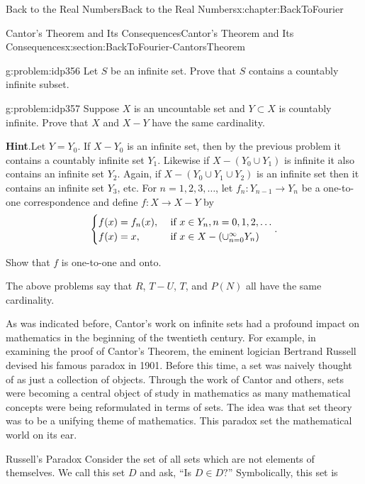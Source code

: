 \begin{chapterptx}{Back to the Real Numbers}{}{Back to the Real Numbers}{}{}{x:chapter:BackToFourier}
\begin{sectionptx}{Cantor's Theorem and Its Consequences}{}{Cantor's Theorem and Its Consequences}{}{}{x:section:BackToFourier-CantorsTheorem}
		\begin{problem}{}{g:problem:idp356}%
			 Let \(S\) be an infinite set. Prove that \(S\) contains a countably infinite subset.%
		\end{problem}
		\begin{problem}{}{g:problem:idp357}%
			Suppose \(X\) is an uncountable set and \(Y\subset X\) is countably infinite.  Prove that \(X\) and \(X-Y\) have the same cardinality.%
			\par\smallskip%
			\noindent\textbf{\blocktitlefont Hint}.\hypertarget{g:hint:idp358}{}\quad{}Let \(Y=Y_0\). If \(X-Y_0\) is an infinite set, then by the previous problem it contains a countably infinite set \(Y_1\). Likewise if \(X-(Y_0\cup Y_1)\) is infinite it also contains an infinite set \(Y_2\). Again, if \(X-(Y_0\cup Y_1\cup Y_2)\) is an infinite set then it contains an infinite set \(Y_3\), etc. For \(n=1, 2, 3,\ldots \), let \(f_n:Y_{n-1}\rightarrow Y_n\) be a one-to-one correspondence and define \(f:X\rightarrow X-Y\) by%
			\begin{equation*}
				\begin{cases}f(x)=f_n(x), & \text{ if }  x\in Y_n, n=0,1,2,\ldots\\ f(x)=x, & \text{ if }  x\in X-(\cup_{n=0}^\infty Y_n ) \end{cases} \text{.}
			\end{equation*}
			\par
			Show that \(f\) is one-to-one and onto.%
		\end{problem}
		The above problems say that \(R\), \(T-U\), \(T\), and \(P(N)\) all have the same cardinality.%
		\par
		As was indicated before, Cantor's  work on infinite sets had a profound impact on mathematics in the beginning of the twentieth century. For example, in examining the proof of Cantor's Theorem, the eminent logician Bertrand Russell devised his famous paradox in 1901. Before this time, a set was naively thought of as just a collection of objects. Through the work of Cantor and others, sets were becoming a central object of study in mathematics as many mathematical concepts were being reformulated in terms of sets. The idea was that set theory was to be a unifying theme of mathematics. This paradox set the mathematical world on its ear.%
		\par
		\textbraceleft{}Russell's Paradox\textbraceright{}  Consider the set of all sets which are not elements of themselves. We call this set \(D\) and ask, ``Is \(D\in D?\)'' Symbolically, this set is%

\end{sectionptx}
\end{chapterptx}

